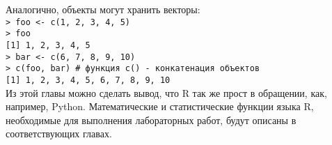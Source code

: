     \indent Аналогично, объекты могут хранить векторы: \\
    \indent \texttt{> foo <- c(1, 2, 3, 4, 5)} \\
    \indent \texttt{> foo} \\
    \indent \texttt{[1] 1, 2, 3, 4, 5} \\
    \indent \texttt{> bar <- c(6, 7, 8, 9, 10)} \\
    \indent \texttt{> c(foo, bar) \# функция c() - конкатенация объектов} \\
    \indent \texttt{[1] 1, 2, 3, 4, 5, 6, 7, 8, 9, 10} \\ 

    \indent Из этой главы можно сделать вывод, что R так же прост в обращении, как, например, Python. 
    Математические и статистические функции языка R, необходимые для выполнения лабораторных 
    работ, будут описаны в соответствующих главах.
    
